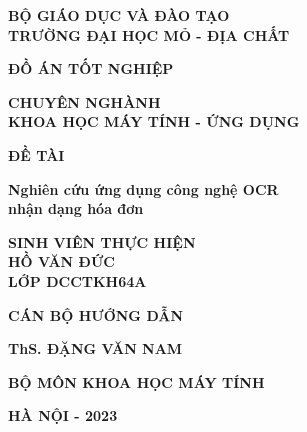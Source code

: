 \newpage
\thispagestyle{empty}
\begin{center}
    \vspace{-6pt} \textbf{\fontsize{18pt}{0}\selectfont BỘ GIÁO DỤC VÀ ĐÀO TẠO} \\
    \vspace{1.5pt}\textbf{\fontsize{18pt}{0}\selectfont TRƯỜNG ĐẠI HỌC MỎ - ĐỊA CHẤT}

    \vspace{4.0cm}
    \textbf{\fontsize{35pt}{0}\selectfont ĐỒ ÁN TỐT NGHIỆP} 

    \vspace{0.5cm}
    \textbf{\fontsize{18pt}{0}\selectfont CHUYÊN NGHÀNH \\ \vspace{0.1cm} KHOA HỌC MÁY TÍNH - ỨNG DỤNG} 

    \vspace{2.5cm}
    \textbf{\fontsize{24pt}{0}\selectfont ĐỀ TÀI} 

    \vspace{0.5cm}
    \textbf{\fontsize{18pt}{0}\selectfont Nghiên cứu ứng dụng công nghệ OCR \\ \vspace{0.1cm}
nhận dạng hóa đơn}
\end{center}

\vspace{1.5cm}
\begin{multicols}{2}
    \begin{center}
        \noindent
        \textbf{\fontsize{15pt}{0}\selectfont SINH VIÊN THỰC HIỆN} \\
        \vspace{0.1cm}\textbf{\fontsize{15pt}{0}\selectfont HỒ VĂN ĐỨC} \\
        \vspace{0.1cm}\textbf{\fontsize{15pt}{0}\selectfont LỚP DCCTKH64A}
    \end{center}
    
    \columnbreak
    
    \begin{center}
        \noindent
        \textbf{\fontsize{15pt}{0}\selectfont CÁN BỘ HƯỚNG DẪN} 

        \vspace{0.1cm}\textbf{\fontsize{15pt}{0}\selectfont ThS. ĐẶNG VĂN NAM}

        \vspace{0.1cm}\textbf{\fontsize{15pt}{0}\selectfont BỘ MÔN KHOA HỌC MÁY TÍNH}
    \end{center}
\end{multicols}

\vspace{1.5cm}
\begin{center}
    \textbf{\fontsize{18pt}{0}\selectfont HÀ NỘI - 2023}
\end{center}